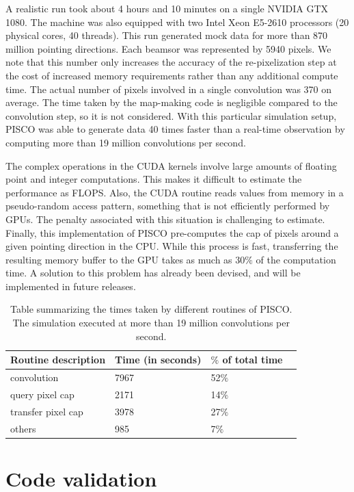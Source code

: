 \documentclass[a4paper,fleqn]{cas-dc}\sloppy
\begin{document}
A realistic run took about 4 hours and 10 minutes on a single NVIDIA GTX 1080. The machine was also equipped with two Intel Xeon E5-2610 processors (20 physical cores, 40 threads). This run generated mock data for more than 870 million pointing directions. Each beamsor was represented by 5940 pixels. We note that this number only increases the accuracy of the re-pixelization step at the cost of increased memory requirements rather than any additional compute time. The actual number of pixels involved in a single convolution was 370 on average. The time taken by the map-making code is negligible compared to the convolution step, so it is not considered. With this particular simulation setup, PISCO was able to generate data 40 times faster than a real-time observation by computing more than 19 million convolutions per second. 

The complex operations in the CUDA kernels involve large amounts of floating point and integer computations. This makes it difficult to estimate the performance as FLOPS. Also, the CUDA routine reads values from memory in a pseudo-random access pattern, something that is not efficiently performed by GPUs. The penalty associated with this situation is challenging to estimate. Finally, this implementation of PISCO pre-computes the cap of pixels around a given pointing direction in the CPU. While this process is fast, transferring the resulting memory buffer to the GPU takes as much as $30\%$ of the computation time. A solution to this problem has already been devised, and will be implemented in future releases.

\begin{table}[width=.9\linewidth,cols=3,pos=h]
	\caption{Table summarizing the times taken by different routines of PISCO. The simulation executed at more than 19 million convolutions per second.}\label{tbl1}
	\begin{tabular*}{\tblwidth}{@{} LLLL@{} }
		\toprule
		Routine description & Time (in seconds) & $\%$ of total time \\
		\midrule
		convolution & 7967 & 52$\%$ & \\
		query pixel cap & 2171 & 14$\%$ & \\
		transfer pixel cap & 3978 & 27$\%$ & \\
		others & 985 & 7$\%$ & \\
		\bottomrule
	\end{tabular*}
\end{table}

%
\section{Code validation}
\end{document}
